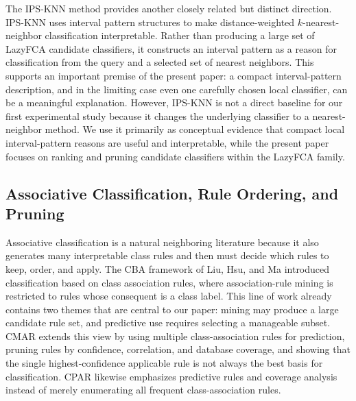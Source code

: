 \documentclass[11pt]{article}
\begin{document}
The IPS-KNN method \cite{tomat2023interval} provides another closely related
but distinct direction. IPS-KNN uses interval pattern structures to make
distance-weighted $k$-nearest-neighbor classification interpretable. Rather
than producing a large set of LazyFCA candidate classifiers, it constructs an interval
pattern as a reason for classification from the query and a selected set of
nearest neighbors. This supports an important premise of the present paper:
a compact interval-pattern description, and in the limiting case even one
carefully chosen local classifier, can be a meaningful explanation. However,
IPS-KNN is not a direct baseline for our first experimental study because it
changes the underlying classifier to a nearest-neighbor method. We use it
primarily as conceptual evidence that compact local interval-pattern reasons
are useful and interpretable, while the present paper focuses on ranking and
pruning candidate classifiers within the LazyFCA family.

\subsection{Associative Classification, Rule Ordering, and Pruning}

Associative classification is a natural neighboring literature because it
also generates many interpretable class rules and then must decide which rules
to keep, order, and apply. The CBA framework of Liu, Hsu, and Ma
\cite{liu1998integrating} introduced classification based on class
association rules, where association-rule mining is restricted to rules whose
consequent is a class label. This line of work already contains two themes
that are central to our paper: mining may produce a large candidate rule set,
and predictive use requires selecting a manageable subset. CMAR
\cite{li2001cmar} extends this view by using multiple class-association rules
for prediction, pruning rules by confidence, correlation, and database
coverage, and showing that the single highest-confidence applicable rule is
not always the best basis for classification. CPAR \cite{yin2003cpar}
likewise emphasizes predictive rules and coverage analysis instead of merely
enumerating all frequent class-association rules.
\end{document}
